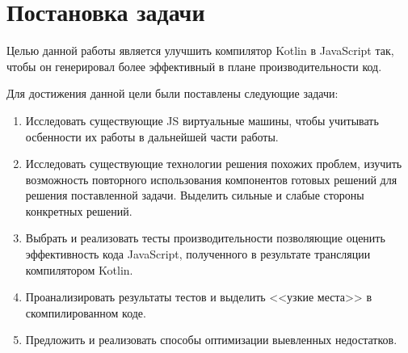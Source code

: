 \chapter{Постановка задачи}

Целью данной работы является улучшить компилятор Kotlin в JavaScript так, чтобы он генерировал более эффективный в плане производительности код.

Для достижения данной цели были поставлены следующие задачи:
\begin{enumerate}
\item Исследовать существующие JS виртуальные машины, чтобы учитывать осбенности их работы в дальнейшей части работы.
\item Исследовать существующие технологии решения похожих проблем, изучить возможность повторного использования компонентов готовых решений для решения поставленной задачи. Выделить сильные и слабые стороны конкретных решений.
\item Выбрать и реализовать тесты производительности позволяющие оценить эффективность кода JavaScript,
полученного в результате трансляции компилятором Kotlin.
\item Проанализировать результаты тестов и выделить <<узкие места>> в скомпилированном коде.
\item Предложить и реализовать способы оптимизации выевленных недостатков.
\end{enumerate}